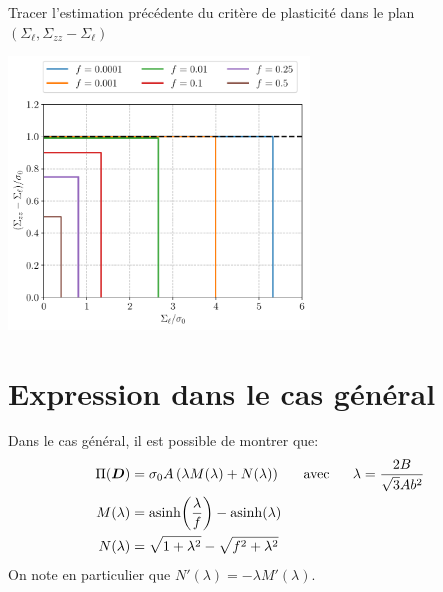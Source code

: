 \documentclass[french,12pt]{exam}
\begin{document}
\begin{questions}
\question Tracer l'estimation précédente du critère de plasticité dans le plan $( \Sigma_\ell, \Sigma_{zz} - \Sigma_\ell )$\\
\begin{solution}

\begin{R_figure}
\includegraphics[width=0.6\textwidth]{Gurson_cylinder_approx}
\end{R_figure}
\end{solution}
\end{questions}

\section{Expression dans le cas général}
Dans le cas général, il est possible de montrer que:
  \begin{align}
    \Pi(\boldsymbol{D}) &= \sigma_0 A \left(\lambda M(\lambda)+N(\lambda)\right) \ \ \ \ \ \mathrm{avec} \ \ \ \ \ \lambda = \frac{2B}{\sqrt{3}Ab^2} \\
    M(\lambda) &=\mathrm{asinh}{\left( \frac{\lambda}{f} \right)} -\mathrm{asinh}{\left( \lambda \right)}\\
    N(\lambda) &= \sqrt{1 + \lambda^2} - \sqrt{f^2 + \lambda^2}
  \end{align}
On note en particulier que $N'(\lambda)= -\lambda M'(\lambda)$.
\end{document}
